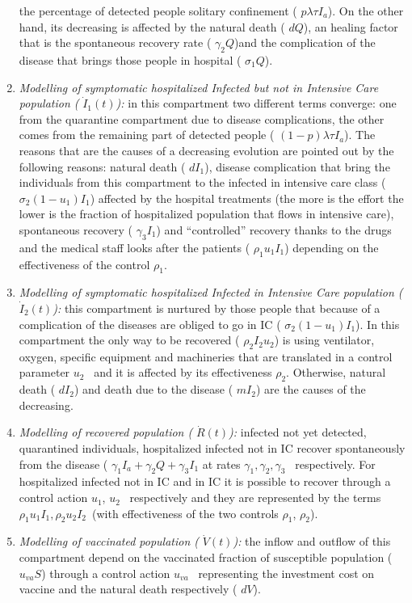 \documentclass[a4paper]{article}
\begin{document}
\begin{enumerate}
the percentage of detected people solitary confinement ( $\mathit{p\lambda \tau }I_a$). On the other hand, its
decreasing is affected by the natural death ( $\mathit{dQ}$), an healing factor that is the spontaneous recovery rate (
$\gamma _2Q$)and the complication of the disease that brings those people in hospital ( $\sigma _1Q$). 
\item \textit{Modelling of symptomatic hospitalized Infected but not in Intensive Care population (} $\dot
I_1\left(t\right)$\textit{): }in this compartment two different terms converge: one from the quarantine compartment due
to disease complications, the other comes from the remaining part of detected people ( $\left(1-p\right)\mathit{\lambda
\tau }I_a$). The reasons that are the causes of a decreasing evolution are pointed out by the following reasons:
natural death ( $dI_1$), disease complication that bring the individuals from this compartment to the infected in
intensive care class ( $\sigma _2\left(1-u_1\right)I_1$) affected by the hospital treatments (the more is the effort
the lower is the fraction of hospitalized population that flows in intensive care), spontaneous recovery ( $\gamma
_3I_1$) and “controlled” recovery thanks to the drugs and the medical staff looks after the patients ( $\rho _1u_1I_1$)
depending on the effectiveness of the control  $\rho _1$. 
\item \textit{Modelling of symptomatic hospitalized Infected in Intensive Care population (} $\dot
I_2\left(t\right)$\textit{): }this compartment is nurtured by those people that because of a complication of the
diseases are obliged to go in IC ( $\sigma _2\left(1-u_1\right)I_1$). In this compartment the only way to be recovered
( $\rho _2I_2u_2$) is using ventilator, oxygen, specific equipment and machineries that are translated in a control
parameter  $u_2$ \ and it is affected by its effectiveness  $\rho _2$. Otherwise, natural death ( $dI_2$) and death due
to the disease ( $mI_2$) are the causes of the decreasing. 
\item \textit{Modelling of recovered population (} $\dot R\left(t\right)$\textit{): }infected not yet detected,
quarantined individuals, hospitalized infected not in IC recover spontaneously from the disease ( $\gamma _1I_a+\gamma
_2Q+\gamma _3I_1$ at rates  $\gamma _1,\gamma _2,\gamma _3$ \ respectively. For hospitalized infected not in IC and in
IC it is possible to recover through a control action  $u_1$,  $u_2$ \ respectively and they are represented by the
terms  $\rho _1u_1I_1,\rho _2u_2I_2$\ (with effectiveness of the two controls  $\rho _1$,  $\rho _2$).
\item \textit{Modelling of vaccinated population (} $\dot V\left(t\right)$\textit{): }the inflow and outflow of this
compartment depend on the vaccinated fraction of susceptible population ( $u_{\mathit{va}}S$) through a control action 
$u_{\mathit{va}}$ \ representing the investment cost on vaccine and the natural death respectively ( $\mathit{dV}$).
\end{enumerate}
\end{document}

